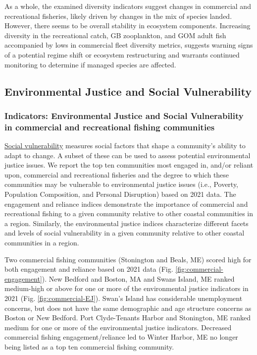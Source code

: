 \documentclass[
  10pt,
]{article}
\begin{document}
As a whole, the examined diversity indicators suggest changes in commercial and recreational fisheries, likely driven by changes in the mix of species landed. However, there seems to be overall stability in ecosystem components. Increasing diversity in the recreational catch, GB zooplankton, and GOM adult fish accompanied by lows in commercial fleet diversity metrics, suggests warning signs of a potential regime shift or ecosystem restructuring and warrants continued monitoring to determine if managed species are affected.

\hypertarget{social-vulnerability}{%
\subsection{Environmental Justice and Social Vulnerability}\label{social-vulnerability}}

\hypertarget{indicators-environmental-justice-and-social-vulnerability-in-commercial-and-recreational-fishing-communities}{%
\subsubsection{Indicators: Environmental Justice and Social Vulnerability in commercial and recreational fishing communities}\label{indicators-environmental-justice-and-social-vulnerability-in-commercial-and-recreational-fishing-communities}}

\href{https://noaa-edab.github.io/catalog/engagement.html}{Social vulnerability} measures social factors that shape a community's ability to adapt to change. A subset of these can be used to assess potential environmental justice issues. We report the top ten communities most engaged in, and/or reliant upon, commercial and recreational fisheries and the degree to which these communities may be vulnerable to environmental justice issues (i.e., Poverty, Population Composition, and Personal Disruption) based on 2021 data. The engagement and reliance indices demonstrate the importance of commercial and recreational fishing to a given community relative to other coastal communities in a region. Similarly, the environmental justice indices characterize different facets and levels of social vulnerability in a given community relative to other coastal communities in a region.

Two commercial fishing communities (Stonington and Beals, ME) scored high for both engagement and reliance based on 2021 data (Fig. \ref{fig:commercial-engagement}). New Bedford and Boston, MA and Swans Island, ME ranked medium-high or above for one or more of the environmental justice indicators in 2021 (Fig. \ref{fig:commercial-EJ}). Swan's Island has considerable unemployment concerns, but does not have the same demographic and age structure concerns as Boston or New Bedford. Port Clyde-Tenants Harbor and Stonington, ME ranked medium for one or more of the environmental justice indicators. Decreased commercial fishing engagement/reliance led to Winter Harbor, ME no longer being listed as a top ten commercial fishing community.
\end{document}
